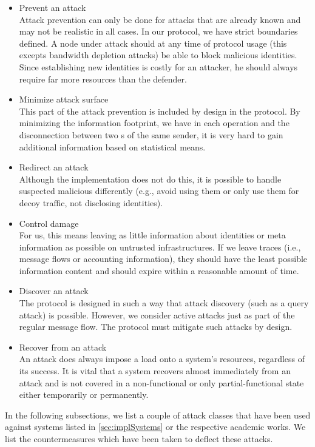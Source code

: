 \begin{itemize}
	\item Prevent an attack\\
 	      Attack prevention can only be done for attacks that are already known and may not be realistic in all cases. In our protocol, we have strict boundaries defined. A node under attack should at any time of protocol usage (this excepts bandwidth depletion attacks) be able to block malicious identities. Since establishing new identities is costly for an attacker, he should always require far more resources than the defender.
	\item Minimize attack surface\\
	      This part of the attack prevention is included by design in the protocol. By minimizing the information footprint, we have in each operation and the disconnection between two s of the same sender, it is very hard to gain additional information based on statistical means.
	\item Redirect an attack\\
	      Although the implementation does not do this, it is possible to handle suspected malicious \VortexNode{} differently (e.g., avoid using them or only use them for decoy traffic, not disclosing identities).
	\item Control damage\\
	      For us, this means leaving as little information about identities or meta information as possible on untrusted infrastructures. If we leave traces (i.e., message flows or accounting information), they should have the least possible information content and should expire within a reasonable amount of time.
	\item Discover an attack\\
	      The protocol is designed in such a way that attack discovery (such as a query attack) is possible. However, we consider active attacks just as part of the regular message flow. The protocol must mitigate such attacks by design.
	\item Recover from an attack\\
	      An attack does always impose a load onto a system's resources, regardless of its success. It is vital that a system recovers almost immediately from an attack and is not covered in a non-functional or only partial-functional state either temporarily or permanently.
\end{itemize}

In the following subsections, we list a couple of attack classes that have been used against systems listed in \ref{sec:implSystems} or the respective academic works. We list the countermeasures which have been taken to deflect these attacks.

